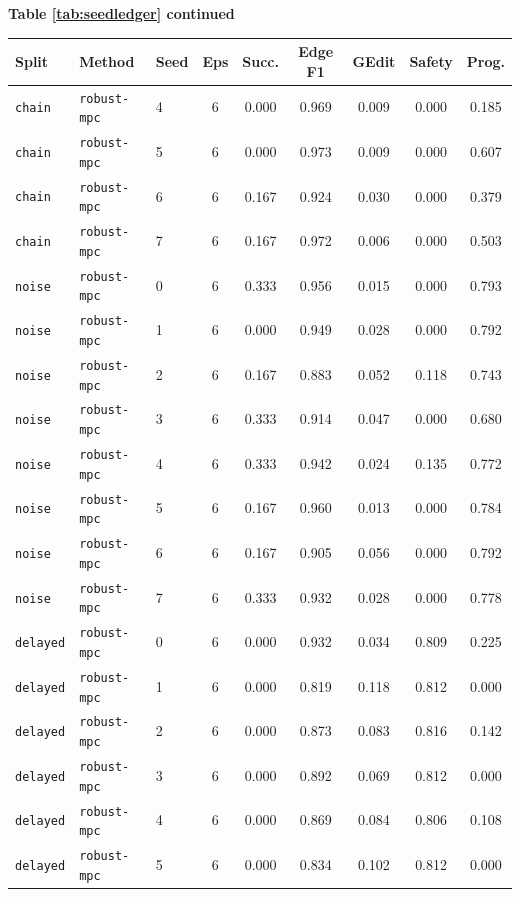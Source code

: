 \documentclass{article}
\begin{document}
\begin{center}
\textbf{Table \ref{tab:seedledger} continued}\\[0.4ex]
\begin{tabular}{lllcccccc}
\toprule
Split & Method & Seed & Eps & Succ. & Edge F1 & GEdit & Safety & Prog. \\
\midrule
\texttt{chain} & \texttt{robust-mpc} & 4 & 6 & 0.000 & 0.969 & 0.009 & 0.000 & 0.185 \\
\texttt{chain} & \texttt{robust-mpc} & 5 & 6 & 0.000 & 0.973 & 0.009 & 0.000 & 0.607 \\
\texttt{chain} & \texttt{robust-mpc} & 6 & 6 & 0.167 & 0.924 & 0.030 & 0.000 & 0.379 \\
\texttt{chain} & \texttt{robust-mpc} & 7 & 6 & 0.167 & 0.972 & 0.006 & 0.000 & 0.503 \\
\texttt{noise} & \texttt{robust-mpc} & 0 & 6 & 0.333 & 0.956 & 0.015 & 0.000 & 0.793 \\
\texttt{noise} & \texttt{robust-mpc} & 1 & 6 & 0.000 & 0.949 & 0.028 & 0.000 & 0.792 \\
\texttt{noise} & \texttt{robust-mpc} & 2 & 6 & 0.167 & 0.883 & 0.052 & 0.118 & 0.743 \\
\texttt{noise} & \texttt{robust-mpc} & 3 & 6 & 0.333 & 0.914 & 0.047 & 0.000 & 0.680 \\
\texttt{noise} & \texttt{robust-mpc} & 4 & 6 & 0.333 & 0.942 & 0.024 & 0.135 & 0.772 \\
\texttt{noise} & \texttt{robust-mpc} & 5 & 6 & 0.167 & 0.960 & 0.013 & 0.000 & 0.784 \\
\texttt{noise} & \texttt{robust-mpc} & 6 & 6 & 0.167 & 0.905 & 0.056 & 0.000 & 0.792 \\
\texttt{noise} & \texttt{robust-mpc} & 7 & 6 & 0.333 & 0.932 & 0.028 & 0.000 & 0.778 \\
\texttt{delayed} & \texttt{robust-mpc} & 0 & 6 & 0.000 & 0.932 & 0.034 & 0.809 & 0.225 \\
\texttt{delayed} & \texttt{robust-mpc} & 1 & 6 & 0.000 & 0.819 & 0.118 & 0.812 & 0.000 \\
\texttt{delayed} & \texttt{robust-mpc} & 2 & 6 & 0.000 & 0.873 & 0.083 & 0.816 & 0.142 \\
\texttt{delayed} & \texttt{robust-mpc} & 3 & 6 & 0.000 & 0.892 & 0.069 & 0.812 & 0.000 \\
\texttt{delayed} & \texttt{robust-mpc} & 4 & 6 & 0.000 & 0.869 & 0.084 & 0.806 & 0.108 \\
\texttt{delayed} & \texttt{robust-mpc} & 5 & 6 & 0.000 & 0.834 & 0.102 & 0.812 & 0.000 \\

\end{tabular}
\end{center}
\end{document}
